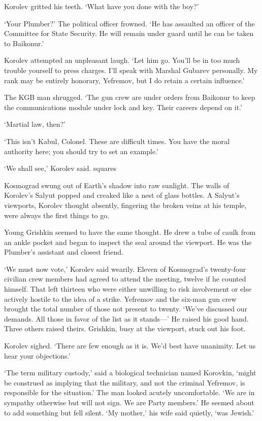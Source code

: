 Korolev gritted his teeth. `What have you done with the boy?'

`Your Plumber?' The political officer frowned. `He has assaulted an officer of the Committee for State Security. He will remain under guard until he can be taken to Baikonur.'

Korolev attempted an unpleasant laugh. `Let him go. You'll be in too much trouble yourself to press charges. I'll speak with Marshal Gubarev personally. My rank may be entirely honorary, Yefremov, but I do retain a certain influence.'

The KGB man shrugged. `The gun crew are under orders from Baikonur to keep the communications module under lock and key. Their careers depend on it.'

`Martial law, then?'

`This isn't Kabul, Colonel. These are difficult times. You have the moral authority here; you should try to set an example.'

`We shall see,' Korolev said.
squares

Kosmograd swung out of Earth's shadow into raw sunlight. The walls of Korolev's Salyut popped and creaked like a nest of glass bottles. A Salyut's viewports, Korolev thought absently, fingering the broken veins at his temple, were always the first things to go.

Young Grishkin seemed to have the same thought. He drew a tube of caulk from an ankle pocket and began to inspect the seal around the viewport. He was the Plumber's assistant and closest friend.

`We must now vote,' Korolev said wearily. Eleven of Kosmograd's twenty-four civilian crew members had agreed to attend the meeting, twelve if he counted himself. That left thirteen who were either unwilling to risk involvement or else actively hostile to the idea of a strike. Yefremov and the six-man gun crew brought the total number of those not present to twenty. `We've discussed our demands. All those in favor of the list as it stands---' He raised his good hand. Three others raised theirs. Grishkin, busy at the viewport, stuck out his foot.

Korolev sighed. `There are few enough as it is. We'd best have unanimity. Let us hear your objections.'

`The term military custody,' said a biological technician named Korovkin, `might be construed as implying that the military, and not the criminal Yefremov, is responsible for the situation.' The man looked acutely uncomfortable. `We are in sympathy otherwise but will not sign. We are Party members.' He seemed about to add something but fell silent. `My mother,' his wife said quietly, `was Jewish.'

